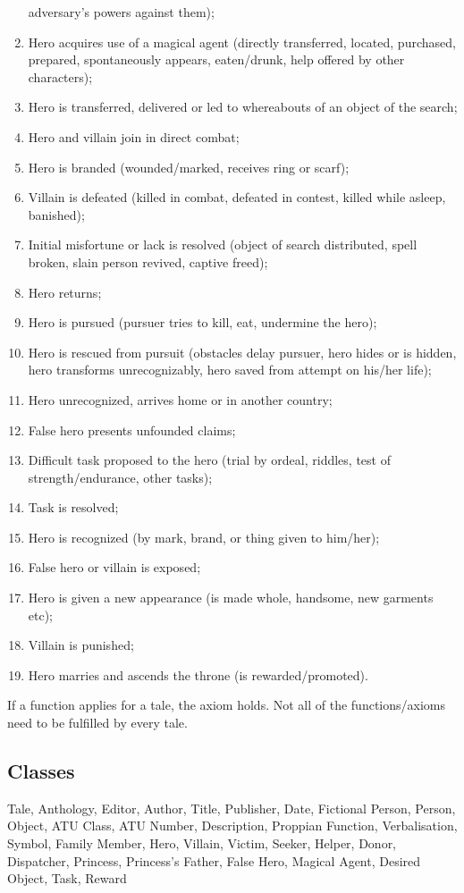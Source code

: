 \documentclass[10pt,a4paper]{article}
\begin{document}
\begin{enumerate}
adversary’s powers against them);
 \item  Hero acquires use of a magical agent (directly transferred,
located, purchased, prepared, spontaneously appears, eaten/drunk,
help offered by other characters);
 \item  Hero is transferred, delivered or led to whereabouts of an
object of the search;
	\item  Hero and villain join in direct combat;
	\item  Hero is branded (wounded/marked, receives ring or scarf);
	 \item  Villain is defeated (killed in combat, defeated in contest, killed
while asleep, banished);
 	\item  Initial misfortune or lack is resolved (object of search
distributed, spell broken, slain person revived, captive freed);
 	\item  Hero returns;
	\item  Hero is pursued (pursuer tries to kill, eat, undermine the hero);
	\item   Hero is rescued from pursuit (obstacles delay pursuer, hero
hides or is hidden, hero transforms unrecognizably, hero saved
from attempt on his/her life);
	\item  Hero unrecognized, arrives home or in another country;
 	\item  False hero presents unfounded claims;
 	\item  Difficult task proposed to the hero (trial by ordeal, riddles, test
of strength/endurance, other tasks);
 	\item  Task is resolved;
 \item  Hero is recognized (by mark, brand, or thing given to
him/her);
 \item False hero or villain is exposed;
 \item  Hero is given a new appearance (is made whole, handsome,
new garments etc);
 \item Villain is punished;
 \item  Hero marries and ascends the throne (is rewarded/promoted).
\end{enumerate}

If a function applies for a tale, the axiom holds. Not all of the functions/axioms need to be fulfilled by every tale.
    
\subsection{Classes}
	\small 
Tale, Anthology, Editor, Author, Title, Publisher, Date, Fictional Person, Person, Object, ATU Class, ATU Number, Description, Proppian Function, Verbalisation, Symbol, Family Member, Hero, Villain, Victim, Seeker, Helper, Donor, Dispatcher, Princess, Princess's Father, False Hero, Magical Agent, Desired Object, Task, Reward 
\end{document}
